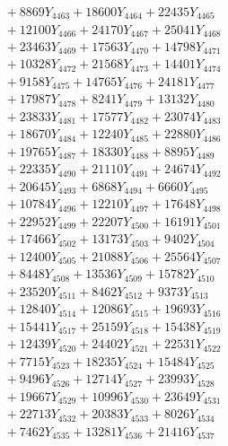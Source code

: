 \documentclass[a4paper,10pt]{article}
\begin{document}
{\begin{align}
&\;  + 8869 Y_{4463} + 18600 Y_{4464} + 22435 Y_{4465} \\[0.3ex]
&\;  + 12100 Y_{4466} + 24170 Y_{4467} + 25041 Y_{4468} \\[0.5ex]\allowbreak
&\;  + 23463 Y_{4469} + 17563 Y_{4470} + 14798 Y_{4471} \\[0.3ex]
&\;  + 10328 Y_{4472} + 21568 Y_{4473} + 14401 Y_{4474} \\[0.3ex]
&\;  + 9158 Y_{4475} + 14765 Y_{4476} + 24181 Y_{4477} \\[0.3ex]
&\;  + 17987 Y_{4478} + 8241 Y_{4479} + 13132 Y_{4480} \\[0.3ex]
&\;  + 23833 Y_{4481} + 17577 Y_{4482} + 23074 Y_{4483} \\[0.3ex]
&\;  + 18670 Y_{4484} + 12240 Y_{4485} + 22880 Y_{4486} \\[0.3ex]
&\;  + 19765 Y_{4487} + 18330 Y_{4488} + 8895 Y_{4489} \\[0.3ex]
&\;  + 22335 Y_{4490} + 21110 Y_{4491} + 24674 Y_{4492} \\[0.3ex]
&\;  + 20645 Y_{4493} + 6868 Y_{4494} + 6660 Y_{4495} \\[0.3ex]
&\;  + 10784 Y_{4496} + 12210 Y_{4497} + 17648 Y_{4498} \\[0.5ex]\allowbreak
&\;  + 22952 Y_{4499} + 22207 Y_{4500} + 16191 Y_{4501} \\[0.3ex]
&\;  + 17466 Y_{4502} + 13173 Y_{4503} + 9402 Y_{4504} \\[0.3ex]
&\;  + 12400 Y_{4505} + 21088 Y_{4506} + 25564 Y_{4507} \\[0.3ex]
&\;  + 8448 Y_{4508} + 13536 Y_{4509} + 15782 Y_{4510} \\[0.3ex]
&\;  + 23520 Y_{4511} + 8462 Y_{4512} + 9373 Y_{4513} \\[0.3ex]
&\;  + 12840 Y_{4514} + 12086 Y_{4515} + 19693 Y_{4516} \\[0.3ex]
&\;  + 15441 Y_{4517} + 25159 Y_{4518} + 15438 Y_{4519} \\[0.3ex]
&\;  + 12439 Y_{4520} + 24402 Y_{4521} + 22531 Y_{4522} \\[0.3ex]
&\;  + 7715 Y_{4523} + 18235 Y_{4524} + 15484 Y_{4525} \\[0.3ex]
&\;  + 9496 Y_{4526} + 12714 Y_{4527} + 23993 Y_{4528} \\[0.5ex]\allowbreak
&\;  + 19667 Y_{4529} + 10996 Y_{4530} + 23649 Y_{4531} \\[0.3ex]
&\;  + 22713 Y_{4532} + 20383 Y_{4533} + 8026 Y_{4534} \\[0.3ex]
&\;  + 7462 Y_{4535} + 13281 Y_{4536} + 21416 Y_{4537} \\[0.3ex]

\end{align}}
\end{document}
